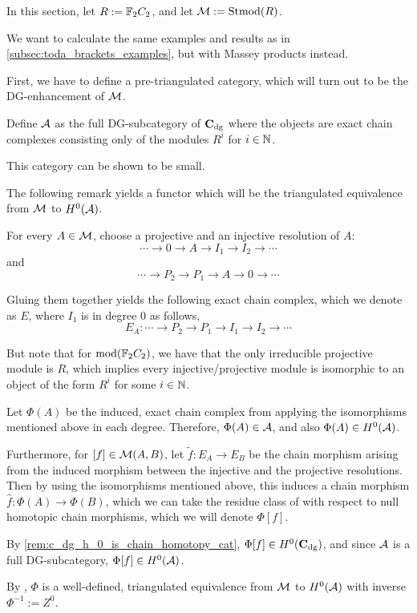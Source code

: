 In this section, let \( R := {\mathbb{F}}_2 C_2 \), and let \( {\mathcal{M}} := \operatorname{Stmod}(R) \).

We want to calculate the same examples and results as in \autoref{subsec:toda_brackets_examples}, but with Massey products instead.

First, we have to define a pre-triangulated category, which will turn out to be the DG-enhancement of \( {\mathcal{M}} \).

\begin{definition}
    Define \( {\mathcal{A}} \) as the full DG-subcategory of \( \operatorname{\mathbf{C}}_{\operatorname{dg}} \) where the objects are exact chain complexes consisting only of the modules \( R^i \) for \( i \in {\mathbb{N}} \).
\end{definition}

This category can be shown to be small.

The following remark yields a functor which will be the triangulated equivalence from \( {\mathcal{M}} \) to \( H^0({\mathcal{A}}) \).

\begin{remark}
    For every \( A \in {\mathcal{M}} \), choose a projective and an injective resolution of \( A \):
    \[
        \cdots \to 0 \to A \to I_1 \to I_2 \to \cdots
    \]
    and
    \[
        \cdots \to P_2 \to P_1 \to A \to 0 \to \cdots
    \]

    Gluing them together yields the following exact chain complex, which we denote as \( E \), where \( I_1 \) is in degree \( 0 \) as follows,
    \[
        E_A: \cdots \to P_2 \to P_1 \to I_1 \to I_2 \to \cdots
    \]

    But note that for \( \operatorname{mod}({\mathbb{F}}_2 C_2) \), we have that the only irreducible projective module is \( R \), which implies every injective/projective module is isomorphic to an object of the form \( R^i \) for some \( i \in {\mathbb{N}} \).

    Let \( \Phi(A) \) be the induced, exact chain complex from applying the isomorphisms mentioned above in each degree. Therefore, \( \Phi(A) \in {\mathcal{A}} \), and also \( \Phi(A) \in H^0({\mathcal{A}}) \).

    Furthermore, for \( [f] \in {\mathcal{M}}(A, B) \), let \( \tilde{f}: E_A \to E_B \) be the chain morphism arising from the induced morphism between the injective and the projective resolutions. Then by using the isomorphisms mentioned above, this induces a chain morphism \( \hat{f}: \Phi(A) \to \Phi(B) \), which we can take the residue class of with respect to null homotopic chain morphisms, which we will denote \( \Phi[f] \).

    By \autoref{rem:c_dg_h_0_is_chain_homotopy_cat}, \( \Phi[f] \in H^0(\operatorname{\mathbf{C}}_{\operatorname{dg}}) \), and since \( {\mathcal{A}} \) is a full DG-subcategory, \( \Phi[f] \in H^0({\mathcal{A}}) \).

    By \cite[Section 7.5]{Krause_2007}, \( \Phi \) is a well-defined, triangulated equivalence from \( {\mathcal{M}} \) to \( H^0({\mathcal{A}}) \) with inverse \( \Phi^{-1} := Z^0 \).
\end{remark}

